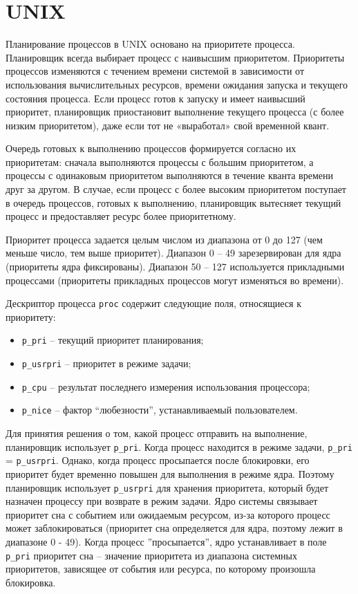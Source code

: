 \section{UNIX}

Планирование процессов в UNIX основано на приоритете процесса. Планировщик всегда выбирает процесс с наивысшим приоритетом. Приоритеты процессов изменяются с течением времени системой в зависимости от использования вычислительных ресурсов, времени ожидания запуска и текущего состояния процесса. Если процесс готов к запуску и имеет наивысший приоритет, планировщик приостановит выполнение текущего процесса (с более низким приоритетом), даже если тот не «выработал» свой временной квант.

Очередь готовых к выполнению процессов формируется согласно их приоритетам: сначала выполняются процессы с большим приоритетом, а процессы с одинаковым приоритетом выполняются в течение кванта времени друг за другом. В случае, если процесс с более высоким приоритетом поступает в очередь процессов, готовых к выполнению, планировщик вытесняет текущий процесс и предоставляет ресурс более приоритетному. 

Приоритет процесса задается целым числом из диапазона от 0 до 127 (чем меньше число, тем выше приоритет). Диапазон 0 -- 49 зарезервирован для ядра (приоритеты ядра фиксированы). Диапазон 50 -- 127 используется прикладными процессами (приоритеты прикладных процессов могут изменяться во времени).

Дескриптор процесса \texttt{proc} содержит следующие поля, относящиеся к приоритету:
\begin{itemize}
    \item \texttt{p\_pri} – текущий приоритет планирования;
    \item \texttt{p\_usrpri} – приоритет в режиме задачи;
    \item \texttt{p\_cpu} – результат последнего измерения использования процессора;
    \item \texttt{p\_nice} – фактор ``любезности'', устанавливаемый пользователем.
\end{itemize}

Для принятия решения о том, какой процесс отправить на выполнение, планировщик использует \texttt{p\_pri}. Когда процесс находится в режиме задачи, \texttt{p\_pri} = \texttt{p\_usrpri}. Однако, когда процесс просыпается после блокировки, его приоритет будет временно повышен для выполнения в режиме ядра. Поэтому планировщик использует \texttt{p\_usrpri} для хранения приоритета, который будет назначен процессу при возврате в режим задачи. Ядро системы связывает приоритет сна с событием или ожидаемым ресурсом, из-за которого процесс может заблокироваться (приоритет сна определяется для ядра, поэтому лежит в диапазоне 0 - 49). Когда процесс ”просыпается”, ядро устанавливает в поле \texttt{p\_pri} приоритет сна – значение приоритета из диапазона системных приоритетов, зависящее от события или ресурса, по которому произошла блокировка.

